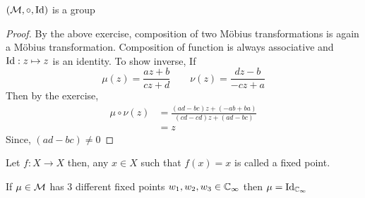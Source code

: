 \documentclass{article}
\begin{document}
\begin{thm}
    $(\mathcal{M}, \circ, \mathrm{Id})$ is a group
\end{thm}

\begin{proof}
    By the above exercise, composition of two M\"obius transformations is again a M\"obius transformation.
    Composition of function is always associative and $\mathrm{Id}: z \mapsto z$ is an identity. To show inverse, If
    \[
        \mu(z) = \frac{az + b}{cz+ d} \qquad \nu(z) = \frac{dz -b}{-cz + a}
    \]
    Then by the exercise, 
    \begin{align*}
        \mu \circ \nu (z) &= \frac{(ad-bc)z + (-ab + ba)}{(cd - cd)z + (ad - bc)} \\
        &= z
    \end{align*}
    Since, $(ad-bc) \neq 0$
\end{proof}


\begin{defi}
    Let $f: X \rightarrow X$ then, any $x \in X$ such that $f(x) = x$ is called a fixed point.
\end{defi}

\begin{lemma}
    If $\mu \in \mathcal{M}$ has 3 different fixed points $w_1, w_2, w_3 \in \mathbb{C}_\infty$ then $\mu = \mathrm{Id}_{\mathbb{C}_\infty}$
\end{lemma}
\end{document}

